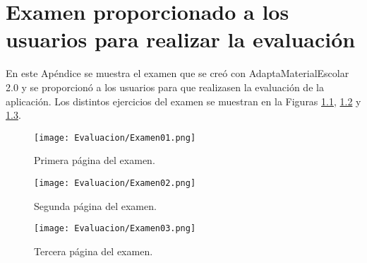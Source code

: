 \chapter{Examen proporcionado a los usuarios para realizar la evaluación}\label{ape:examenEvaluacion}

En este Apéndice se muestra el examen que se creó con AdaptaMaterialEscolar 2.0 y se proporcionó a los usuarios para que realizasen la evaluación de la aplicación. Los distintos ejercicios del examen se muestran en la Figuras \ref{fig:examenEvaluacionA}, \ref{fig:examenEvaluacionB} y \ref{fig:examenEvaluacionC}.

\begin{figure}[H]
    \centering
    \texttt{[image: Evaluacion/Examen01.png]}
    \caption{Primera página del examen.}
    \label{fig:examenEvaluacionA}
\end{figure}

\begin{figure}[H]
    \centering
    \texttt{[image: Evaluacion/Examen02.png]}
    \caption{Segunda página del examen.}
    \label{fig:examenEvaluacionB}
\end{figure}

\begin{figure}[H]
    \centering
    \texttt{[image: Evaluacion/Examen03.png]}
    \caption{Tercera página del examen.}
    \label{fig:examenEvaluacionC}
\end{figure}
